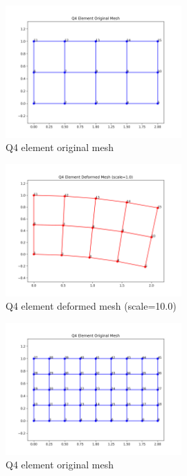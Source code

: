 \documentclass[a4paper,12pt]{report}
\begin{document}
\begin{figure}[htbp]
    \centering
    \includegraphics[width=0.6\textwidth]{test2_4_original.png}
    \caption{Q4 element original mesh }
    \label{fig:patch2_4_original}
\end{figure}

\begin{figure}[htbp]
    \centering
    \includegraphics[width=0.6\textwidth]{test2_4_deformed.png}
    \caption{Q4 element deformed mesh (scale=10.0)}
    \label{fig:patch2_4_deform}
\end{figure}

\begin{figure}[htbp]
    \centering
    \includegraphics[width=0.6\textwidth]{test4_8_original.png}
    \caption{Q4 element original mesh }
    \label{fig:patch4_8_original}
\end{figure}
\end{document}
